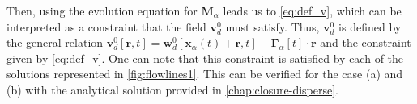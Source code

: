 Then, using the evolution equation for $\textbf{M}_\alpha$ leads us to \ref{eq:def_v}, which can be interpreted as a constraint that the field $\textbf{v}_d^0$ must satisfy. 
Thus, $\textbf{v}_d^0$ is defined by the general relation $\textbf{v}^0_d[\textbf{r},t] =\textbf{w}^{0}_{d}[\textbf{x}_\alpha(t)+\textbf{r},t]  - \bm\Gamma_{\alpha}[t] \cdot \textbf{r}$ and the constraint given by \ref{eq:def_v}. 
One can note that this constraint is satisfied by each of the solutions represented in \ref{fig:flowlines1}.
This can be verified for the case (a) and (b) with the analytical solution provided in \ref{chap:closure-disperse}. 






